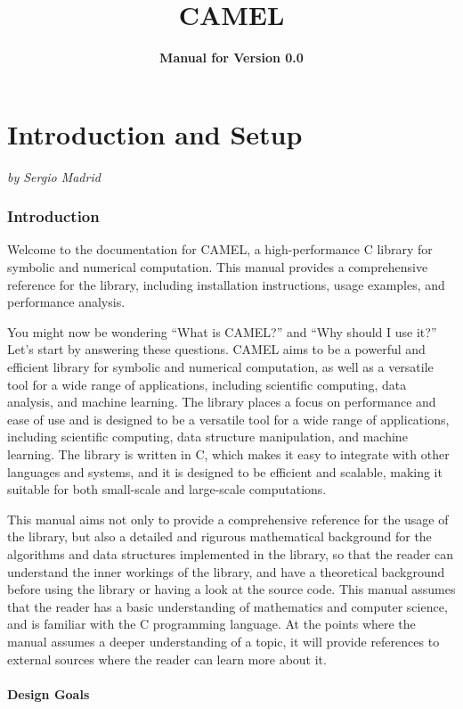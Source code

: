 \documentclass[a4paper,oneside,8pt]{extarticle}
\title{\textbf{CAMEL}}
\author{\textbf{Manual for Version 0.0}}
\newcommand{\authoredpart}[2]{
  \clearpage
  \part{#1}
  \vspace{-1em} %
  \Large{\textit{by #2}}
  \vspace{2em} %
}
\theoremstyle{definition}
\begin{document}
\maketitle
\thispagestyle{empty}
\newpage

\tableofcontents
\newpage


\authoredpart{Introduction and Setup}{Sergio Madrid}

\section{Introduction}

Welcome to the documentation for CAMEL, a high-performance C library for symbolic and numerical computation. This manual provides a comprehensive reference for the library, including installation instructions, usage examples, and performance analysis.

You might now be wondering ``What is CAMEL?'' and ``Why should I use it?'' Let's start by answering these questions. CAMEL aims to be a powerful and efficient library for symbolic and numerical computation, as well as a versatile tool for a wide range of applications, including scientific computing, data analysis, and machine learning. The library places a focus on performance and ease of use and is designed to be a versatile tool for a wide range of applications, including scientific computing, data structure manipulation, and machine learning. The library is written in C, which makes it easy to integrate with other languages and systems, and it is designed to be efficient and scalable, making it suitable for both small-scale and large-scale computations.

This manual aims not only to provide a comprehensive reference for the usage of the library, but also a detailed and rigurous mathematical background for the algorithms and data structures implemented in the library, so that the reader can understand the inner workings of the library, and have a theoretical background before using the library or having a look at the source code. This manual assumes that the reader has a basic understanding of mathematics and computer science, and is familiar with the C programming language. At the points where the manual assumes a deeper understanding of a topic, it will provide references to external sources where the reader can learn more about it.

\subsection{Design Goals}
\end{document}
